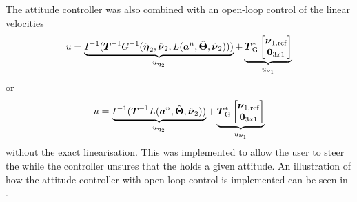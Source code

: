 The attitude controller was also combined with an open-loop control of the linear velocities
\begin{equation}
	u = \underbrace{I^{-1}(\boldsymbol{T}^{-1} G^{-1}(\hat{\etaVector}_2,\hat{\nuVector}_2,L(\accVector^n,\hat{\eulerAngles},\hat{\nuVector}_2)))}_{u_{\etaVectorAng}} + \underbrace{\thrusterGeometryOnes[*] \begin{bmatrix} \nuVector_{1,\text{ref}} \\ \zeroCol{3} \end{bmatrix}}_{u_{\nuVectorLin}}
\end{equation}
or
\begin{equation}
	u = \underbrace{I^{-1}(\boldsymbol{T}^{-1} L(\accVector^n,\hat{\eulerAngles},\hat{\nuVector}_2))}_{u_{\etaVectorAng}} + \underbrace{\thrusterGeometryOnes[*] \begin{bmatrix} \nuVector_{1,\text{ref}} \\ \zeroCol{3} \end{bmatrix}}_{u_{\nuVectorLin}}
\end{equation}
without the exact linearisation. This was implemented to allow the user to steer the \abbrROV while the controller unsures that the \abbrROV holds a given attitude. An illustration of how the attitude controller with open-loop control is implemented can be seen in .

